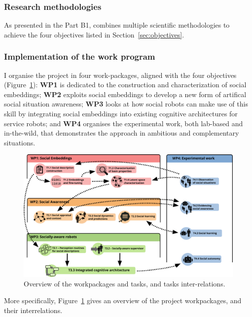 \subsubsection{Research methodologies}

As presented in the Part B1, \project combines multiple scientific
methodologies to achieve the four objectives listed in
Section~\ref{sec:objectives}.



\subsubsection{Implementation of the work program}

I organise the project in four work-packages, aligned with the four objectives
(Figure~\ref{fig:wps}): \textbf{WP1} is dedicated to the construction and
characterization of social embeddings; \textbf{WP2} exploits social embeddings
to develop a new form of artifical social situation awareness; \textbf{WP3} looks at how
social robots can make use of this skill by integrating social embeddings into
existing cognitive architectures for service robots; and \textbf{WP4} organises
the experimental work, both lab-based and in-the-wild, that demonstrates the
\project approach in ambitious and complementary situations.


\begin{figure}[h!]
\centering
\includegraphics[height=0.6\linewidth]{figs/wps}
\caption{Overview of the workpackages and tasks, and tasks inter-relations.}
\label{fig:wps}
\end{figure}

More specifically, Figure~\ref{fig:wps} gives an overview of the project
workpackages, and their interrelations.


